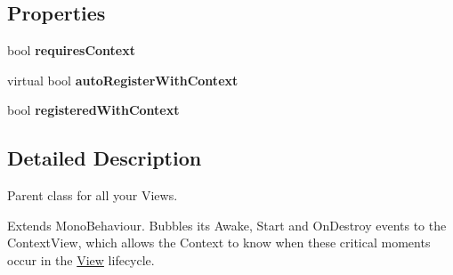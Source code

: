 \subsection*{Properties}
\begin{DoxyCompactItemize}
\item 
\hypertarget{classstrange_1_1extensions_1_1mediation_1_1impl_1_1_view_ad830e5b03b04691f18ea3fe83a6b2a6d}{bool {\bfseries requires\-Context}}\label{classstrange_1_1extensions_1_1mediation_1_1impl_1_1_view_ad830e5b03b04691f18ea3fe83a6b2a6d}

\item 
\hypertarget{classstrange_1_1extensions_1_1mediation_1_1impl_1_1_view_a4d4caa8347d951f066e01626fa837a57}{virtual bool {\bfseries auto\-Register\-With\-Context}}\label{classstrange_1_1extensions_1_1mediation_1_1impl_1_1_view_a4d4caa8347d951f066e01626fa837a57}

\item 
\hypertarget{classstrange_1_1extensions_1_1mediation_1_1impl_1_1_view_a08f38be9f2708de9af4eaabf6c7dcb4c}{bool {\bfseries registered\-With\-Context}}\label{classstrange_1_1extensions_1_1mediation_1_1impl_1_1_view_a08f38be9f2708de9af4eaabf6c7dcb4c}

\end{DoxyCompactItemize}


\subsection{Detailed Description}
Parent class for all your Views. 

Extends Mono\-Behaviour. Bubbles its Awake, Start and On\-Destroy events to the Context\-View, which allows the Context to know when these critical moments occur in the \hyperlink{classstrange_1_1extensions_1_1mediation_1_1impl_1_1_view}{View} lifecycle. 

